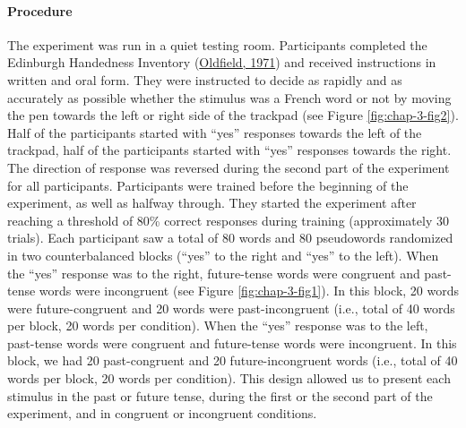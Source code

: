 \documentclass[
  a4paper,12pt,twoside,onecolumn,openright,final,oldfontcommands]{memoir}
\begin{document}
\hypertarget{procedure}{%
\paragraph{Procedure}\label{procedure}}

The experiment was run in a quiet testing room. Participants completed the Edinburgh Handedness Inventory (\protect\hyperlink{ref-oldfield_assessment_1971}{Oldfield, 1971}) and received instructions in written and oral form. They were instructed to decide as rapidly and as accurately as possible whether the stimulus was a French word or not by moving the pen towards the left or right side of the trackpad (see Figure \ref{fig:chap-3-fig2}). Half of the participants started with ``yes'' responses towards the left of the trackpad, half of the participants started with ``yes'' responses towards the right. The direction of response was reversed during the second part of the experiment for all participants. Participants were trained before the beginning of the experiment, as well as halfway through. They started the experiment after reaching a threshold of 80\% correct responses during training (approximately 30 trials). Each participant saw a total of 80 words and 80 pseudowords randomized in two counterbalanced blocks (``yes'' to the right and ``yes'' to the left). When the ``yes'' response was to the right, future-tense words were congruent and past-tense words were incongruent (see Figure \ref{fig:chap-3-fig1}). In this block, 20 words were future-congruent and 20 words were past-incongruent (i.e., total of 40 words per block, 20 words per condition). When the ``yes'' response was to the left, past-tense words were congruent and future-tense words were incongruent. In this block, we had 20 past-congruent and 20 future-incongruent words (i.e., total of 40 words per block, 20 words per condition). This design allowed us to present each stimulus in the past or future tense, during the first or the second part of the experiment, and in congruent or incongruent conditions.
\end{document}
